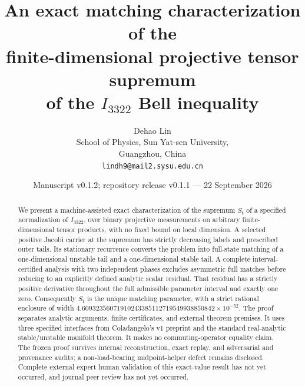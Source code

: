 \documentclass[11pt,letterpaper]{article}
\title{An exact matching characterization of the\texorpdfstring{\\}{ }finite-dimensional projective tensor supremum\texorpdfstring{\\}{ }of the \texorpdfstring{$I_{3322}$}{I3322} Bell inequality}
\author{Dehao Lin\\
\small School of Physics, Sun Yat-sen University,\\
\small Guangzhou, China\\
\texttt{lindh9@mail2.sysu.edu.cn}}
\date{Manuscript v0.1.2; repository release v0.1.1 --- 22 September 2026}
\theoremstyle{definition}
\theoremstyle{remark}
\numberwithin{equation}{section}
\newcommand{\St}{S_{\mathrm t}}
\begin{document}
\maketitle
\begin{abstract}
We present a machine-assisted exact characterization of the supremum
\(\St\) of a specified normalization of \(I_{3322}\), over binary projective
measurements on arbitrary finite-dimensional tensor products, with no fixed
bound on local dimension. A selected positive Jacobi carrier at the supremum
has strictly decreasing labels and prescribed outer tails. Its stationary
recurrence converts the problem into full-state matching of a one-dimensional
unstable tail and a one-dimensional stable tail. A complete interval-certified
analysis with two independent phases excludes asymmetric full matches before
reducing to an explicitly defined analytic scalar residual. That residual has
a strictly positive derivative throughout the full admissible parameter
interval and exactly one zero. Consequently \(\St\) is the unique matching
parameter, with a strict rational enclosure of width
\(4.60932356071910243385112719549938850842\times10^{-52}\).
The proof separates analytic arguments, finite certificates, and external
theorem premises. It uses three specified interfaces from Coladangelo's v1
preprint and the standard real-analytic stable/unstable manifold theorem.
It makes no commuting-operator equality claim. The frozen proof survives
internal reconstruction, exact replay, and adversarial and provenance audits;
a non-load-bearing midpoint-helper defect remains disclosed. Complete external
expert human validation of this exact-value result has not yet occurred, and
journal peer review has not yet occurred.
\end{abstract}
\tableofcontents











\appendix







\end{document}
